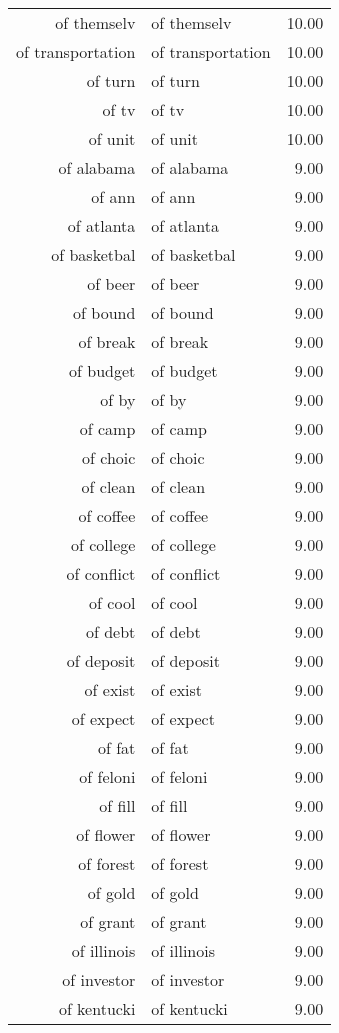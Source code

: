 \begin{table}[ht]
\begin{tabular}{rlr}
  of themselv & of themselv & 10.00 \\ 
  of transportation & of transportation & 10.00 \\ 
  of turn & of turn & 10.00 \\ 
  of tv & of tv & 10.00 \\ 
  of unit & of unit & 10.00 \\ 
  of alabama & of alabama & 9.00 \\ 
  of ann & of ann & 9.00 \\ 
  of atlanta & of atlanta & 9.00 \\ 
  of basketbal & of basketbal & 9.00 \\ 
  of beer & of beer & 9.00 \\ 
  of bound & of bound & 9.00 \\ 
  of break & of break & 9.00 \\ 
  of budget & of budget & 9.00 \\ 
  of by & of by & 9.00 \\ 
  of camp & of camp & 9.00 \\ 
  of choic & of choic & 9.00 \\ 
  of clean & of clean & 9.00 \\ 
  of coffee & of coffee & 9.00 \\ 
  of college & of college & 9.00 \\ 
  of conflict & of conflict & 9.00 \\ 
  of cool & of cool & 9.00 \\ 
  of debt & of debt & 9.00 \\ 
  of deposit & of deposit & 9.00 \\ 
  of exist & of exist & 9.00 \\ 
  of expect & of expect & 9.00 \\ 
  of fat & of fat & 9.00 \\ 
  of feloni & of feloni & 9.00 \\ 
  of fill & of fill & 9.00 \\ 
  of flower & of flower & 9.00 \\ 
  of forest & of forest & 9.00 \\ 
  of gold & of gold & 9.00 \\ 
  of grant & of grant & 9.00 \\ 
  of illinois & of illinois & 9.00 \\ 
  of investor & of investor & 9.00 \\ 
  of kentucki & of kentucki & 9.00 \\ 

\end{tabular}
\end{table}
